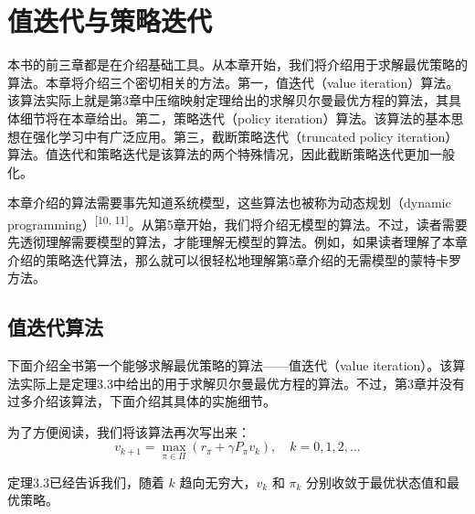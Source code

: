 \chapter{值迭代与策略迭代}
\label{ch:rl-vpi}



本书的前三章都是在介绍基础工具。从本章开始，我们将介绍用于求解最优策略的算法。本章将介绍三个密切相关的方法。第一，值迭代（value iteration）算法。该算法实际上就是第3章中压缩映射定理给出的求解贝尔曼最优方程的算法，其具体细节将在本章给出。第二，策略迭代（policy iteration）算法。该算法的基本思想在强化学习中有广泛应用。第三，截断策略迭代（truncated policy iteration）算法。值迭代和策略迭代是该算法的两个特殊情况，因此截断策略迭代更加一般化。

本章介绍的算法需要事先知道系统模型，这些算法也被称为动态规划（dynamic programming）\textsuperscript{[10, 11]}。从第5章开始，我们将介绍无模型的算法。不过，读者需要先透彻理解需要模型的算法，才能理解无模型的算法。例如，如果读者理解了本章介绍的策略迭代算法，那么就可以很轻松地理解第5章介绍的无需模型的蒙特卡罗方法。

\section{值迭代算法}
\label{sec:rl-vpi-value-iteration}

下面介绍全书第一个能够求解最优策略的算法——值迭代（value iteration）。该算法实际上是定理3.3中给出的用于求解贝尔曼最优方程的算法。不过，第3章并没有过多介绍该算法，下面介绍其具体的实施细节。

为了方便阅读，我们将该算法再次写出来：
\begin{equation}
v_{k+1} = \max_{\pi \in \varPi} (r_{\pi} + \gamma P_{\pi} v_{k}), \quad k = 0, 1, 2, \ldots
\end{equation}

定理3.3已经告诉我们，随着 $k$ 趋向无穷大，$v_{k}$ 和 $\pi_{k}$ 分别收敛于最优状态值和最优策略。

